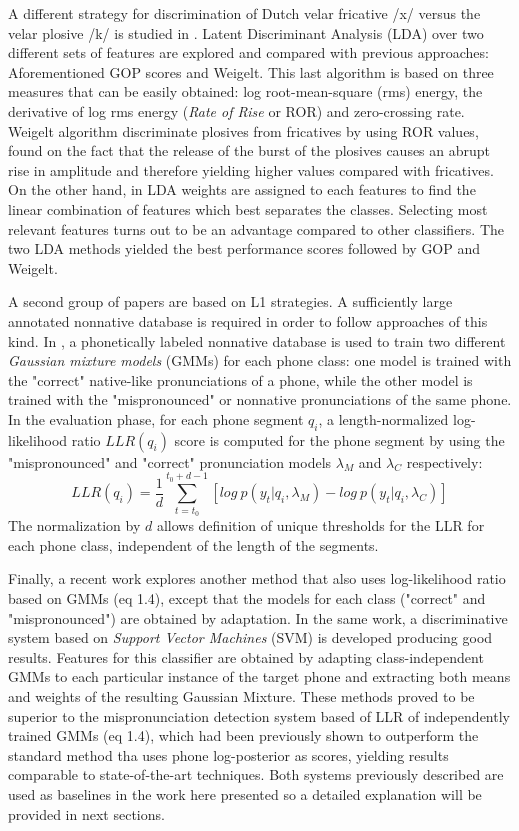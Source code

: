 A different strategy for discrimination of Dutch velar fricative /x/ versus the velar plosive
/k/ is studied in \cite{lda_weigelt}. Latent Discriminant Analysis (LDA) over two different sets
of features are explored and compared with previous approaches: Aforementioned GOP scores and
Weigelt. This last algorithm is based on three measures that can be easily obtained:
log root-mean-square (rms) energy, the derivative of log rms energy (\textit{Rate of Rise} or
ROR) and zero-crossing rate. Weigelt algorithm discriminate plosives from fricatives by using
ROR values, found on the fact that the release of the burst of the plosives causes an abrupt
rise in amplitude and therefore yielding higher values compared with fricatives.
On the other hand, in LDA weights are assigned to each features to 
find the linear combination of features
which best separates the classes. Selecting most relevant features turns out to be an
advantage compared to other classifiers. The two LDA methods yielded the best performance
scores followed by GOP and Weigelt.

A second group of papers are based on L1 strategies. A sufficiently large annotated nonnative
database is required in order to follow approaches of this kind.
In \cite{detection_phone_level_mispronunciation_learning}, a phonetically labeled nonnative
database is used to train two different \textit{Gaussian mixture models} (GMMs) for each phone
class: one model is trained with the "correct" native-like pronunciations of a phone, while the
other model is trained with the "mispronounced" or nonnative pronunciations of the same phone.
In the evaluation phase, for each phone segment $q_{i}$, a length-normalized log-likelihood ratio
$LLR(q_{i})$ score is computed for the phone segment by using the "mispronounced" and "correct"
pronunciation models $\lambda_{M}$ and $\lambda_{C}$ respectively:
\begin{equation}
LLR(q_{i}) = \frac{1}{d}\sum_{t=t_{0}}^{t_{0}+d-1} [log \ p(y_{t}|q_{i}, \lambda_{M}) - log \ p(y_{t}|q_{i}, \lambda_{C})]
\end{equation}
The normalization by $d$ allows definition of unique thresholds for the LLR for each phone class, 
independent of the length of the segments.

Finally, a recent work \cite{main} explores another method that also uses 
log-likelihood ratio based on  GMMs (eq 1.4), except that the models for each 
class ("correct" and  "mispronounced") are obtained by adaptation. In the same work, 
a discriminative system based
on \textit{Support Vector Machines} (SVM) is developed producing good results. Features 
for this classifier are obtained by adapting class-independent GMMs to each particular 
instance of the target phone and extracting both means and weights of the resulting 
Gaussian Mixture.
These methods proved to be superior to the mispronunciation detection system based of 
LLR of independently trained GMMs (eq 1.4), which had been previously shown to 
outperform the standard method tha uses phone log-posterior as scores, yielding
results comparable to state-of-the-art techniques.
Both systems previously described are used as baselines in the work here 
presented so a detailed explanation will be provided in next sections.
